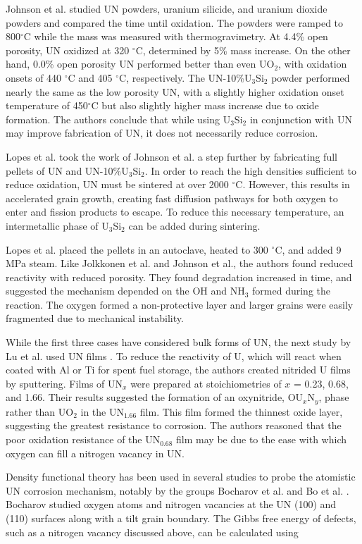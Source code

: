 \documentclass[3p,review,11pt]{elsarticle}
\begin{document}
Johnson et al. \cite{Johnson2016} studied UN powders, uranium silicide, and uranium dioxide powders and compared the time until oxidation. The powders were ramped to 800$^{\circ}$C while the mass was measured with thermogravimetry. At 4.4\% open porosity, UN oxidized at 320 $^{\circ}$C, determined by 5\% mass increase. On the other hand, 0.0\% open porosity UN performed better than even UO$_{2}$, with oxidation onsets of 440 $^{\circ}$C and 405 $^{\circ}$C, respectively. The UN-10\%U$_{3}$Si$_{2}$ powder performed nearly the same as the low porosity UN, with a slightly higher oxidation onset temperature of 450$^{\circ}$C but also slightly higher mass increase due to oxide formation. The authors conclude that while using U$_{3}$Si$_{2}$ in conjunction with UN may improve fabrication of UN, it does not necessarily reduce corrosion.
\par 
Lopes et al. \cite{Lopes2017} took the work of Johnson et al. a step further by fabricating full pellets of UN and UN-10\%U$_{3}$Si$_{2}$. In order to reach the high densities sufficient to reduce oxidation, UN must be sintered at over 2000 $^{\circ}$C. However, this results in accelerated grain growth, creating fast diffusion pathways for both oxygen to enter and fission products to escape. To reduce this necessary temperature, an intermetallic phase of U$_{3}$Si$_{2}$ can be added during sintering.
\par 
Lopes et al. placed the pellets in an autoclave, heated to 300 $^{\circ}$C, and added 9 MPa steam. Like Jolkkonen et al. and Johnson et al., the authors found reduced reactivity with reduced porosity. They found degradation increased in time, and suggested the mechanism depended on the OH and NH$_{3}$ formed during the reaction. The oxygen formed a non-protective layer and larger grains were easily fragmented due to mechanical instability.

While the first three cases have considered bulk forms of UN, the next study by Lu et al. used UN films \cite{Lu2016}. To reduce the reactivity of U, which will react when coated with Al or Ti for spent fuel storage, the authors created nitrided U films by sputtering. Films of UN$_{x}$ were prepared at stoichiometries of $x$ = 0.23, 0.68, and 1.66. Their results suggested the formation of an oxynitride, OU$_{x}$N$_{y}$, phase rather than UO$_{2}$ in the UN$_{1.66}$ film. This film formed the thinnest oxide layer, suggesting the greatest resistance to corrosion. The authors reasoned that the poor oxidation resistance of the UN$_{0.68}$ film may be due to the ease with which oxygen can fill a nitrogen vacancy in UN.
\par 
Density functional theory has been used in several studies to probe the atomistic UN corrosion mechanism, notably by the groups Bocharov et al. \cite{Bocharov2013} and Bo et al. \cite{Bo2016}. Bocharov studied oxygen atoms and nitrogen vacancies at the UN (100) and (110) surfaces along with a tilt grain boundary. The Gibbs free energy of defects, such as a nitrogen vacancy discussed above, can be calculated using
\end{document}

